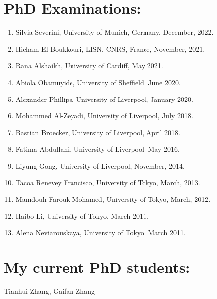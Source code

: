 \documentclass[a4paper,11pt]{article}
\begin{document}
\section{PhD Examinations:}
\begin{enumerate}
\item Silvia Severini, University of Munich, Germany, December, 2022.
\item Hicham El Boukkouri, LISN, CNRS, France, November, 2021.
\item Rana Alshaikh, University of Cardiff, May 2021.
\item Abiola Obamuyide, University of Sheffield, June 2020.
\item Alexander Phillips, University of Liverpool, January 2020.
\item Mohammed Al-Zeyadi, University of Liverpool, July 2018.
\item Bastian Broecker, University of Liverpool, April 2018.
\item Fatima Abdullahi, University of Liverpool, May 2016.
\item Liyung Gong, University of Liverpool, November, 2014.
\item Tacoa Renevey Francisco, University of Tokyo, March, 2013.
\item Mamdouh Farouk Mohamed, University of Tokyo, March, 2012.
\item Haibo Li, University of Tokyo, March 2011.
\item Alena Neviarouskaya, University of Tokyo, March 2011.
\end{enumerate}

\section{My current PhD students:}
Tianhui Zhang, Gaifan Zhang


\end{document}
